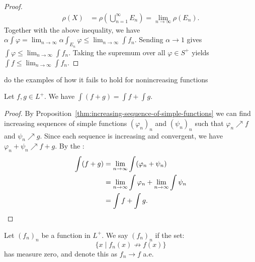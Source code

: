 \begin{proof}
            \begin{equation*}
            \begin{split}
                \rho(X) 
                & = \rho \left( \bigcup_{n = 1}^\infty E_n \right) = \lim_{n \rightarrow \infty} \rho(E_n).
            \end{split}
            \end{equation*}
        Together with the above inequality, we have $\alpha \int \varphi = \lim_{n \rightarrow \infty} \alpha \int_{E_n}\varphi \leq \lim_{n \rightarrow \infty }\int f_n$. Sending $\alpha \rightarrow 1$ gives $\int \varphi \leq \lim_{n \rightarrow \infty} \int f_n$. Taking the supremum over all $\varphi \in S^+$ yields $\int f \leq \lim_{n \rightarrow \infty}\int f_n$. 
    \end{proof}

\begin{example}
    {\color{red} do the examples of how it fails to hold for nonincreasing functions}
\end{example}

\begin{corollary}
    Let $f,g \in L^+$. We have $\int (f + g) = \int f + \int g$.
\end{corollary}
    \begin{proof}
        By Proposition~\ref{thm:increasing-sequence-of-simple-functions} we can find increasing sequences of simple functions $(\varphi_n)_n$ and $(\psi_n)_n$ such that $\varphi_n \nearrow f$ and $\psi_n \nearrow g$. Since each sequence is increasing and convergent, we have $\varphi_n + \psi_n \nearrow f+g$. By the :
            \begin{equation*}
            \begin{split}
                \int (f+g) 
                & = \lim_{n \rightarrow \infty}\int (\varphi_n + \psi_n) \\
                & = \lim_{n \rightarrow \infty}\int \varphi_n  + \lim_{n \rightarrow \infty}\int \psi_n \\ 
                & = \int f + \int g. \qedhere
            \end{split}
            \end{equation*}
    \end{proof}

\begin{definition}
    Let $(f_n)_n$ be a function in $L^+$. We say $(f_n)_n$  if the set:
        \begin{equation*}
        \{x \mid f_n(x) \not\rightarrow f(x)\}
        \end{equation*}
    has measure zero, and denote this as $f_n \rightarrow f$ a.e.
\end{definition}

